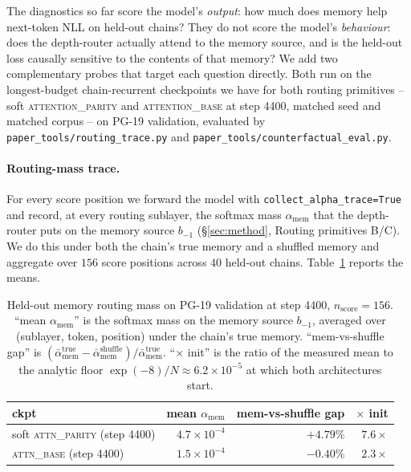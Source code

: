 \documentclass{article}
\begin{document}
The diagnostics so far score the model's \emph{output}: how much does
memory help next-token NLL on held-out chains? They do not score the
model's \emph{behaviour}: does the depth-router actually attend to the
memory source, and is the held-out loss causally sensitive to the
contents of that memory? We add two complementary probes that target
each question directly. Both run on the longest-budget chain-recurrent
checkpoints we have for both routing primitives -- soft
\textsc{attention\_parity} and \textsc{attention\_base} at step 4400,
matched seed and matched corpus -- on PG-19 validation, evaluated by
\texttt{paper\_tools/routing\_trace.py} and
\texttt{paper\_tools/counterfactual\_eval.py}.

\paragraph{Routing-mass trace.}
For every score position we forward the model with
\texttt{collect\_alpha\_trace=True} and record, at every routing
sublayer, the softmax mass $\alpha_{\text{mem}}$ that the depth-router
puts on the memory source $b_{-1}$ (\S\ref{sec:method}, Routing
primitives B/C). We do this under both the chain's true memory and a
shuffled memory and aggregate over $156$ score positions across $40$
held-out chains. Table~\ref{tab:routing_mass} reports the means.

\begin{table}[t]
\centering
\caption{Held-out memory routing mass on PG-19 validation at step
4400, $n_{\text{score}}=156$. ``mean $\alpha_{\text{mem}}$'' is the
softmax mass on the memory source $b_{-1}$, averaged over (sublayer,
token, position) under the chain's true memory. ``mem-vs-shuffle gap''
is $(\bar{\alpha}_{\text{mem}}^{\text{true}} -
\bar{\alpha}_{\text{mem}}^{\text{shuffle}})\big/\bar{\alpha}_{\text{mem}}^{\text{true}}$.
``$\times$ init'' is the ratio of the measured mean to the analytic
floor $\exp(-8)/N \approx 6.2{\times}10^{-5}$ at which both
architectures start.}
\label{tab:routing_mass}
\small
\begin{tabular}{lrrr}
\toprule
ckpt & mean $\alpha_{\text{mem}}$ & mem-vs-shuffle gap & $\times$ init \\
\midrule
soft \textsc{attn\_parity}  (step 4400) & $4.7{\times}10^{-4}$ & $+4.79\%$ & $7.6\times$ \\
\textsc{attn\_base}         (step 4400) & $1.5{\times}10^{-4}$ & $-0.40\%$ & $2.3\times$ \\
\bottomrule
\end{tabular}
\end{table}
\end{document}
